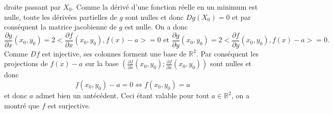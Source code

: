 {\begin{enumerate}
{droite passant par $X_0$. Comme la d\'eriv\'e d'une fonction
r\'eelle en un minimum est nulle, toute les d\'eriv\'ees
partielles de $g$ sont nulles et donc $Dg(X_0)=0$ et par
cons\'equent la matrice jacobienne de $g$ est nulle. On a donc
$$\frac{\partial g}{\partial x}(x_0,y_0)=2<\frac{\partial
f}{\partial x}(x_0,y_0),f(x)-a>=0 \mbox{ et } \frac{\partial
g}{\partial y}(x_0,y_0)=2<\frac{\partial f}{\partial
y}(x_0,y_0),f(x)-a>=0.$$ Comme $Df$ est injective, ses colonnes
forment une base de $\mathbb{R}^2$. Par cons\'equent les
projections de $f(x)-a$ sur la base $(\frac{\partial f}{\partial
x}(x_0,y_0);\frac{\partial f}{\partial x}(x_0,y_0))$ sont nulles
et donc $$f(x_0,y_0)-a=0 \Leftrightarrow f(x_0,y_0)=a$$ et donc
$a$ admet bien un ant\'ec\'edent. Ceci \'etant valable pour tout
$a\in \mathbb{R}^2$, on a montr\'e que $f$ est surjective.}
\end{enumerate}
}
